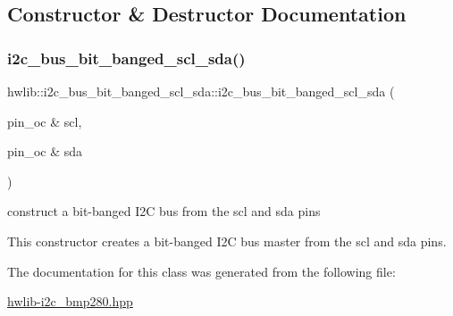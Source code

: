 \subsection{Constructor \& Destructor Documentation}
\mbox{\label{classhwlib_1_1i2c__bus__bit__banged__scl__sda_aff6b11113640da8c8f04b60081bef5ae}} 
\subsubsection{\texorpdfstring{i2c\_bus\_bit\_banged\_scl\_sda()}{i2c\_bus\_bit\_banged\_scl\_sda()}}
{\footnotesize\ttfamily hwlib\+::i2c\+\_\+bus\+\_\+bit\+\_\+banged\+\_\+scl\+\_\+sda\+::i2c\+\_\+bus\+\_\+bit\+\_\+banged\+\_\+scl\+\_\+sda (\begin{DoxyParamCaption}\item[{pin\+\_\+oc \&}]{scl,  }\item[{pin\+\_\+oc \&}]{sda }\end{DoxyParamCaption})\hspace{0.3cm}{\ttfamily [inline]}}

construct a bit-\/banged I2C bus from the scl and sda pins

This constructor creates a bit-\/banged I2C bus master from the scl and sda pins. 

The documentation for this class was generated from the following file\+:\begin{DoxyCompactItemize}
\item 
\mbox{\hyperlink{hwlib-i2c__bmp280_8hpp}{hwlib-\/i2c\+\_\+bmp280.\+hpp}}\end{DoxyCompactItemize}
